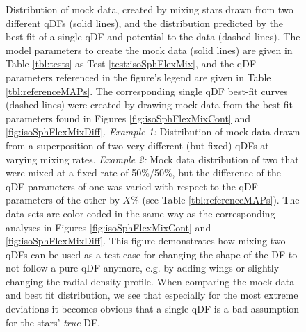 \begin{figure}
\caption{Distribution of mock data, created by mixing stars drawn from two different qDFs (solid lines), and the distribution predicted by the best fit of a single qDF and potential to the data (dashed lines). The model parameters to create the mock data (solid lines) are given in Table \ref{tbl:tests} as Test \ref{test:isoSphFlexMix}, and the qDF parameters referenced in the figure's legend are given in Table \ref{tbl:referenceMAPs}. The corresponding single qDF best-fit curves (dashed lines) were created by drawing mock data from the best fit parameters found in Figures \ref{fig:isoSphFlexMixCont} and \ref{fig:isoSphFlexMixDiff}. \emph{Example 1:} Distribution of mock data drawn from a superposition of two very different (but fixed) qDFs at varying mixing rates. \emph{Example 2:} Mock data distribution of two \MAPs{} that were mixed at a fixed rate of 50\%/50\%, but the difference of the qDF parameters of one \MAP{} was varied with respect to the qDF parameters of the other \MAP{} by $X\%$ (see Table \ref{tbl:referenceMAPs}). The data sets are color coded in the same way as the corresponding analyses in Figures  \ref{fig:isoSphFlexMixCont} and \ref{fig:isoSphFlexMixDiff}. This figure demonstrates how mixing two qDFs can be used as a test case for changing the shape of the DF to not follow a pure qDF anymore, e.g. by adding wings or slightly changing the radial density profile. When comparing the mock data and best fit distribution, we see that especially for the most extreme deviations it becomes obvious that a single qDF is a bad assumption for the stars' \emph{true} DF. }
\label{fig:isoSphFlexMix_mockdata_residuals}
\end{figure}



